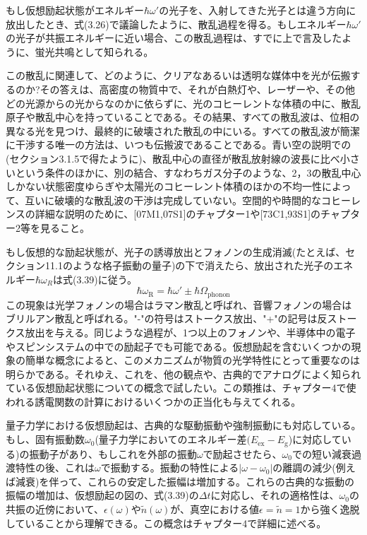 \documentclass[11pt,a4j,uplatex]{jsarticle}
\begin{document}
もし仮想励起状態がエネルギー$\hbar\omega'$の光子を、入射してきた光子とは違う方向に放出したとき、式(3.26)で議論したように、散乱過程を得る。もしエネルギー$\hbar\omega'$の光子が共振エネルギーに近い場合、この散乱過程は、すでに上で言及したように、蛍光共鳴として知られる。

この散乱に関連して、どのように、クリアなあるいは透明な媒体中を光が伝搬するのか?その答えは、高密度の物質中で、それが白熱灯や、レーザーや、その他どの光源からの光からなのかに依らずに、光のコヒーレントな体積の中に、散乱原子や散乱中心を持っていることである。その結果、すべての散乱波は、位相の異なる光を見つけ、最終的に破壊された散乱の中にいる。すべての散乱波が簡潔に干渉する唯一の方法は、いつも伝搬波であることである。青い空の説明での(セクション3.1.5で得たように)、散乱中心の直径が散乱放射線の波長に比べ小さいという条件のほかに、別の結合、すなわちガス分子のような、2，3の散乱中心しかない状態密度ゆらぎや太陽光のコヒーレント体積のほかの不均一性によって、互いに破壊的な散乱波の干渉は完成していない。空間的や時間的なコヒーレンスの詳細な説明のために、[07M1,07S1]のチャプター1や[73C1,93S1]のチャプター2等を見ること。%

もし仮想的な励起状態が、光子の誘導放出とフォノンの生成消滅(たとえば、セクション11.1のような格子振動の量子)の下で消えたら、放出された光子のエネルギー$\hbar\omega_R$は式(3.39)に従う。
\begin{equation}
  \hbar\omega_{\mathrm{R}}=\hbar\omega'\pm\hbar\Omega_{\mathrm{phonon}}\tag{3.39}
\end{equation}
この現象は光学フォノンの場合はラマン散乱と呼ばれ、音響フォノンの場合はブリルアン散乱と呼ばれる。"-"の符号はストークス放出、"+"の記号は反ストークス放出を与える。同じような過程が、1つ以上のフォノンや、半導体中の電子やスピンシステムの中での励起子でも可能である。仮想励起を含むいくつかの現象の簡単な概念によると、このメカニズムが物質の光学特性にとって重要なのは明らかである。それゆえ、これを、他の観点や、古典的でアナログによく知られている仮想励起状態についての概念で試したい。この類推は、チャプター4で使われる誘電関数の計算におけるいくつかの正当化も与えてくれる。

量子力学における仮想励起は、古典的な駆動振動や強制振動にも対応している。もし、固有振動数$\omega_0$(量子力学においてのエネルギー差$(E_{\mathrm{ex}}-E_{\mathrm{g}}$)に対応している)の振動子があり、もしこれを外部の振動$\omega$で励起させたら、$\omega_0$での短い減衰過渡特性の後、これは$\omega$で振動する。振動の特性による$\left|\omega-\omega_0\right|$の離調の減少(例えば減衰)を伴って、これらの安定した振幅は増加する。これらの古典的な振動の振幅の増加は、仮想励起の図の、式(3.39)の$\Delta t$に対応し、それの適格性は、$\omega_0$の共振の近傍において、$\epsilon(\omega)$や$\tilde{n}(\omega)$が、真空における値$\epsilon=\tilde{n}=1$から強く逸脱していることから理解できる。この概念はチャプター4で詳細に述べる。
\end{document}
